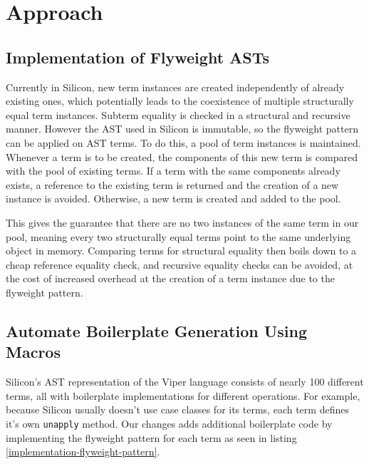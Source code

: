 \documentclass[11pt]{article}
\begin{document}
    \newpage
    \section{Approach}

    \subsection{Implementation of Flyweight ASTs}

    Currently in Silicon, new term instances are created independently of already existing ones, which potentially leads 
    to the coexistence of multiple structurally equal term instances. Subterm equality is checked in a
    structural and recursive manner.
    However the AST used in Silicon is immutable, so the flyweight pattern \cite{patterns}
    can be applied on AST terms.
    To do this, a pool of term instances is maintained. Whenever a term
    is to be created, the components of this new term is compared with the
    pool of existing terms. If a term with the same components already exists,
    a reference to the existing term is returned and
    the creation of a new instance is avoided. Otherwise, a new term is created and added to
    the pool.

    This gives the guarantee that there are no two instances of the
    same term in our pool, meaning every two structurally equal terms point to the same
    underlying object in memory. Comparing terms for structural equality then boils
    down to a cheap reference equality check, and recursive equality checks can be avoided,
    at the cost of increased overhead at the creation of a term instance due to the flyweight pattern.

    \subsection{Automate Boilerplate Generation Using Macros} \label{boilerplate-generation-using-macros}

    Silicon's AST representation of the Viper language consists of nearly 100 different terms,
    all with boilerplate implementations for different operations. For example,
    because Silicon usually doesn't use case classes for its terms,
    each term defines it's own \texttt{unapply} method.
    Our changes adds additional boilerplate code by implementing
    the flyweight pattern for each term as seen in listing \ref{implementation-flyweight-pattern}.
\end{document}
